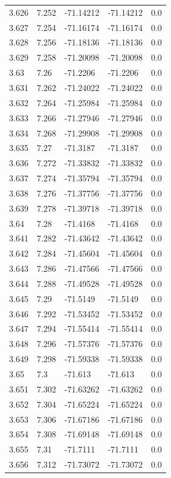 \begin{tabular}{lllll}
3.626 & 7.252 & -71.14212 & -71.14212 & 0.0 \\
3.627 & 7.254 & -71.16174 & -71.16174 & 0.0 \\
3.628 & 7.256 & -71.18136 & -71.18136 & 0.0 \\
3.629 & 7.258 & -71.20098 & -71.20098 & 0.0 \\
3.63 & 7.26 & -71.2206 & -71.2206 & 0.0 \\
3.631 & 7.262 & -71.24022 & -71.24022 & 0.0 \\
3.632 & 7.264 & -71.25984 & -71.25984 & 0.0 \\
3.633 & 7.266 & -71.27946 & -71.27946 & 0.0 \\
3.634 & 7.268 & -71.29908 & -71.29908 & 0.0 \\
3.635 & 7.27 & -71.3187 & -71.3187 & 0.0 \\
3.636 & 7.272 & -71.33832 & -71.33832 & 0.0 \\
3.637 & 7.274 & -71.35794 & -71.35794 & 0.0 \\
3.638 & 7.276 & -71.37756 & -71.37756 & 0.0 \\
3.639 & 7.278 & -71.39718 & -71.39718 & 0.0 \\
3.64 & 7.28 & -71.4168 & -71.4168 & 0.0 \\
3.641 & 7.282 & -71.43642 & -71.43642 & 0.0 \\
3.642 & 7.284 & -71.45604 & -71.45604 & 0.0 \\
3.643 & 7.286 & -71.47566 & -71.47566 & 0.0 \\
3.644 & 7.288 & -71.49528 & -71.49528 & 0.0 \\
3.645 & 7.29 & -71.5149 & -71.5149 & 0.0 \\
3.646 & 7.292 & -71.53452 & -71.53452 & 0.0 \\
3.647 & 7.294 & -71.55414 & -71.55414 & 0.0 \\
3.648 & 7.296 & -71.57376 & -71.57376 & 0.0 \\
3.649 & 7.298 & -71.59338 & -71.59338 & 0.0 \\
3.65 & 7.3 & -71.613 & -71.613 & 0.0 \\
3.651 & 7.302 & -71.63262 & -71.63262 & 0.0 \\
3.652 & 7.304 & -71.65224 & -71.65224 & 0.0 \\
3.653 & 7.306 & -71.67186 & -71.67186 & 0.0 \\
3.654 & 7.308 & -71.69148 & -71.69148 & 0.0 \\
3.655 & 7.31 & -71.7111 & -71.7111 & 0.0 \\
3.656 & 7.312 & -71.73072 & -71.73072 & 0.0 \\

\end{tabular}
